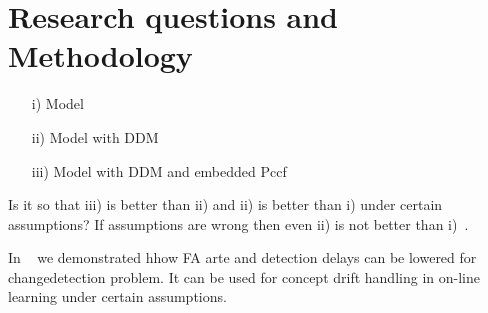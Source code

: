 \chapter{Research questions and Methodology}
\begin{itemize}
  \item [i)] Model
  \item [ii)] Model with DDM
  \item [iii)] Model with DDM and embedded Pccf
\end{itemize}

Is it so that iii) is better than ii) and ii) is better than i) under certain assumptions?
If assumptions are wrong then even ii) is not better than i)~\cite{SouzaRMB20}.

In ~\cite{XXX} we demonstrated hhow FA arte and detection delays can be lowered for changedetection problem.
It can be used for concept drift handling in on-line learning under certain assumptions.
